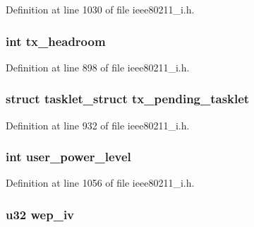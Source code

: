Definition at line 1030 of file ieee80211\-\_\-i.\-h.

\hypertarget{structieee80211__local_acf548b161496ab61ff27e8ae5aa59aff}{
\subsubsection[{tx\-\_\-headroom}]{\setlength{\rightskip}{0pt plus 5cm}int tx\-\_\-headroom}}\label{structieee80211__local_acf548b161496ab61ff27e8ae5aa59aff}


Definition at line 898 of file ieee80211\-\_\-i.\-h.

\hypertarget{structieee80211__local_aebdf516672c673478395a1f1a1bda6ab}{
\subsubsection[{tx\-\_\-pending\-\_\-tasklet}]{\setlength{\rightskip}{0pt plus 5cm}struct tasklet\-\_\-struct tx\-\_\-pending\-\_\-tasklet}}\label{structieee80211__local_aebdf516672c673478395a1f1a1bda6ab}


Definition at line 932 of file ieee80211\-\_\-i.\-h.

\hypertarget{structieee80211__local_a769dfa727897d182933a132cf92c480e}{
\subsubsection[{user\-\_\-power\-\_\-level}]{\setlength{\rightskip}{0pt plus 5cm}int user\-\_\-power\-\_\-level}}\label{structieee80211__local_a769dfa727897d182933a132cf92c480e}


Definition at line 1056 of file ieee80211\-\_\-i.\-h.

\hypertarget{structieee80211__local_ac63790cf9fa02ac7ac0c4282cfe5b041}{
\subsubsection[{wep\-\_\-iv}]{\setlength{\rightskip}{0pt plus 5cm}u32 wep\-\_\-iv}}\label{structieee80211__local_ac63790cf9fa02ac7ac0c4282cfe5b041}


